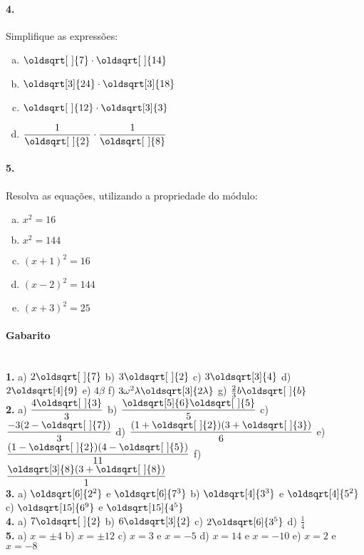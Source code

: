 \documentclass[a4paper,12pt]{article}
\renewcommand*{\sqrt}[2][\ ]{\oldsqrt[#1]{#2}}
\begin{document}
\begin{multicols}{2}
\paragraph*{4.} Simplifique as expressões:
\begin{enumerate}[a)]
    \item $\sqrt{7}\cdot\sqrt{14}$
    \item $\sqrt[3]{24}\cdot\sqrt[3]{18}$
    \item $\sqrt{12}\cdot\sqrt[3]{3}$
    \item $\displaystyle\frac{1}{\sqrt{2}}\cdot \frac{1}{\sqrt{8}}$
\end{enumerate}

\paragraph*{5.} Resolva as equações, utilizando a propriedade do módulo:
\begin{enumerate}[a)]
    \item $x^2 = 16$
    \item $x^2 = 144$
    \item $(x+1)^2 = 16$
    \item $(x-2)^2 = 144$
    \item $(x+3)^2 = 25$
\end{enumerate}
\vspace*{3cm}
\end{multicols}
 
\vspace*{\fill}
{\footnotesize
\paragraph*{Gabarito} \hspace*{\fill}\\
\textbf{1.} a) $2\sqrt{7}$ b) $3\sqrt{2}$ c) $3\sqrt[3]{4}$ d) $2\sqrt[4]{9}$ e) $4\beta$ f) $3\omega^2\lambda\sqrt[3]{2\lambda}$ g) $\frac{2}{3}b\sqrt{b}$ \\[1ex]
\textbf{2.}  a) $\dfrac{4\sqrt{3}}{3}$ b) $\dfrac{\sqrt[5]{6}\sqrt{5}}{5}$ c) $\dfrac{-3(2-\sqrt{7})}{3}$ d) $\dfrac{(1+\sqrt{2})(3+\sqrt{3})}{6}$ e) $\dfrac{(1-\sqrt{2})(4-\sqrt{5})}{11}$ f) $\dfrac{\sqrt[3]{8}(3+\sqrt{8})}{1}$ \\[1ex]
\textbf{3.} a) $\sqrt[6]{2^2}$ e $\sqrt[6]{7^3}$ b) $\sqrt[4]{3^3}$ e $\sqrt[4]{5^2}$ c) $\sqrt[15]{6^9}$ e $\sqrt[15]{4^5}$ \\
\textbf{4.} a) $7\sqrt{2}$ b) $6\sqrt[3]{2}$  c) $2\sqrt[6]{3^5}$  d) $\frac{1}{4}$  \\
\textbf{5.} a) $x = \pm 4$ b) $x = \pm 12$ c) $x = 3$ e $x = -5$ d) $x = 14$ e $x=-10$ e) $x = 2$ e $x = -8$
}
\end{document}
